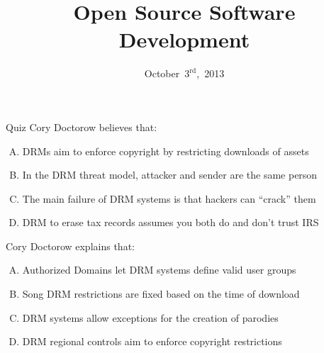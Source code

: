 \documentclass{beamer}
\title{Open Source Software Development}
\date{October~$3^{\text{rd}}$,~2013}
\begin{document}
\begin{frame}
\titlepage
\end{frame}

\begin{frame}{Quiz}
Cory Doctorow believes that:
\begin{enumerate}[(A)]
\item<1> DRMs aim to enforce copyright by restricting downloads of assets %
\item<1> In the DRM threat model, attacker and sender are the same person %
\item<1> The main failure of DRM systems is that hackers can ``crack'' them %
\item<1-2> DRM to erase tax records assumes you both do and don't trust IRS
\end{enumerate}
\bigskip
Cory Doctorow explains that:
\begin{enumerate}[(A)]
\item<1-2> Authorized Domains let DRM systems define valid user groups
\item<1> Song DRM restrictions are fixed based on the time of download
\item<1> DRM systems allow exceptions for the creation of parodies
\item<1> DRM regional controls aim to enforce copyright restrictions
\end{enumerate}
\end{frame}
\end{document}
